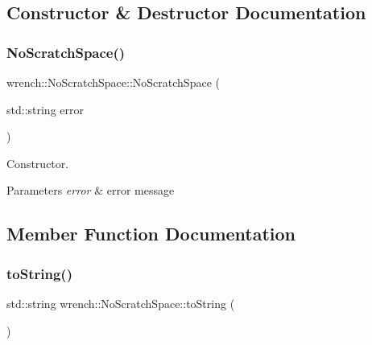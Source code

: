 \subsection{Constructor \& Destructor Documentation}
\mbox{\label{classwrench_1_1_no_scratch_space_a42f786f73e3ddce5921b90a6da828804}} 
\subsubsection{\texorpdfstring{No\+Scratch\+Space()}{NoScratchSpace()}}
{\footnotesize\ttfamily wrench\+::\+No\+Scratch\+Space\+::\+No\+Scratch\+Space (\begin{DoxyParamCaption}\item[{std\+::string}]{error }\end{DoxyParamCaption})}



Constructor. 


\begin{DoxyParams}{Parameters}
{\em error} & error message \\
\hline
\end{DoxyParams}


\subsection{Member Function Documentation}
\mbox{\label{classwrench_1_1_no_scratch_space_add628f91104786a99a410ec07abac54c}} 
\subsubsection{\texorpdfstring{to\+String()}{toString()}}
{\footnotesize\ttfamily std\+::string wrench\+::\+No\+Scratch\+Space\+::to\+String (\begin{DoxyParamCaption}{ }\end{DoxyParamCaption})\hspace{0.3cm}{\ttfamily [virtual]}}



